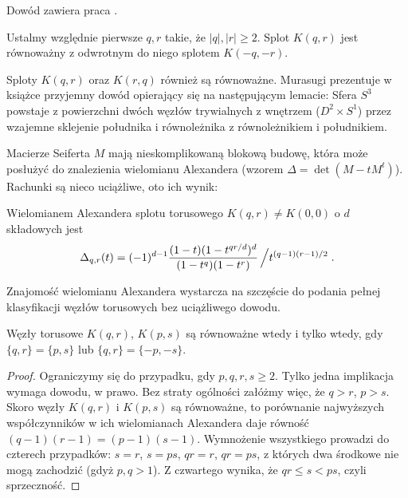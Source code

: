 Dowód zawiera praca \cite{litherland81}.

\begin{proposition}
    Ustalmy względnie pierwsze $q, r$ takie, że $|q|, |r| \ge 2$.
    Splot $K(q, r)$ jest równoważny z odwrotnym do niego splotem $K(-q, -r)$.
\end{proposition}

Sploty $K(q, r)$ oraz $K(r, q)$ również są równoważne.
Murasugi prezentuje w książce \cite{murasugi96} przyjemny dowód opierający się na następującym lemacie:
Sfera $S^3$ powstaje z powierzchni dwóch węzłów trywialnych z wnętrzem ($D^2 \times S^1$) przez wzajemne sklejenie południka i równoleżnika z równoleżnikiem i południkiem.


Macierze Seiferta $M$ mają nieskomplikowaną blokową budowę, która może posłużyć do znalezienia wielomianu Alexandera (wzorem $\Delta = \det (M - tM^t)$).
Rachunki są nieco uciążliwe, oto ich wynik:

\begin{proposition}
    Wielomianem Alexandera splotu torusowego $K(q, r) \neq K(0,0)$ o $d$ składowych jest
    \[
        \Delta_{q, r}(t) = (-1)^{d-1} \frac{(1-t)(1 - t^{qr/d})^d}{(1-t^q)(1-t^r)} \left/t^{(q-1)(r-1)/2}\right. .
    \]
\end{proposition}

Znajomość wielomianu Alexandera wystarcza na szczęście do podania pełnej klasyfikacji węzłów torusowych bez uciążliwego dowodu.

\begin{proposition}
    Węzły torusowe $K(q, r)$, $K(p, s)$ są równoważne wtedy i tylko wtedy, gdy $\{q, r\} = \{p, s\}$ lub $\{q, r\} = \{-p, -s\}$.
\end{proposition}

\begin{proof}
    Ograniczymy się do przypadku, gdy $p, q, r, s \ge 2$.
    Tylko jedna implikacja wymaga dowodu, w prawo.
    Bez straty ogólności załóżmy więc, że $q > r$, $p > s$.
    Skoro węzły $K(q, r)$ i $K(p,s)$ są równoważne, to porównanie najwyższych współczynników w ich wielomianach Alexandera daje równość $(q-1)(r-1) = (p-1)(s-1)$.
    Wymnożenie wszystkiego prowadzi do czterech przypadków: $s = r$, $s = ps$, $qr = r$, $qr = ps$, z których dwa środkowe nie mogą zachodzić (gdyż $p, q > 1$).
    Z czwartego wynika, że $qr \le s < ps$, czyli sprzeczność.
\end{proof}

